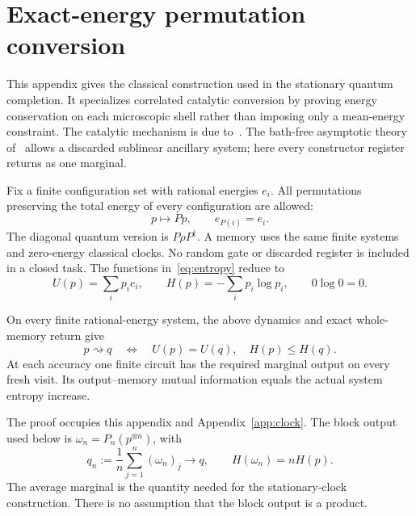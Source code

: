 \section{Exact-energy permutation conversion}\label{app:permutation}
This appendix gives the classical construction used in the stationary quantum completion. It specializes correlated catalytic conversion by proving energy conservation on each microscopic shell rather than imposing only a mean-energy constraint. The catalytic mechanism is due to~\cite{boes,wilming21,wilming22}. The bath-free asymptotic theory of~\cite{sparaciari} allows a discarded sublinear ancillary system; here every constructor register returns as one marginal.

Fix a finite configuration set with rational energies $e_i$. All permutations preserving the total energy of every configuration are allowed:
\begin{equation}
 p\mapsto Pp,\qquad e_{P(i)}=e_i. \label{eq:perms}
\end{equation}
The diagonal quantum version is $P\rho P^\dagger$. A memory uses the same finite systems and zero-energy classical clocks. No random gate or discarded register is included in a closed task. The functions in~\eqref{eq:entropy} reduce to
\begin{equation}
 U(p)=\sum_i p_ie_i,\qquad H(p)=-\sum_i p_i\log p_i,\qquad 0\log0=0. \label{eq:classicalentropy}
\end{equation}
\begin{lemma}\label{lem:classical}
On every finite rational-energy system, the above dynamics and exact whole-memory return give
\begin{equation}
 p\rightsquigarrow q\quad\Longleftrightarrow\quad U(p)=U(q),\quad H(p)\le H(q). \label{eq:classicalorder}
\end{equation}
At each accuracy one finite circuit has the required marginal output on every fresh visit. Its output--memory mutual information equals the actual system entropy increase.
\end{lemma}
The proof occupies this appendix and Appendix~\ref{app:clock}. The block output used below is $\omega_n=P_n(p^{\otimes n})$, with
\begin{equation}
 q_n:=\frac1n\sum_{j=1}^n(\omega_n)_j\longrightarrow q,\qquad H(\omega_n)=nH(p). \label{eq:blockmarginal}
\end{equation}
The average marginal is the quantity needed for the stationary-clock construction. There is no assumption that the block output is a product.

